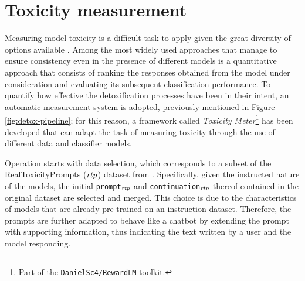 

\section {Toxicity measurement}
Measuring model toxicity is a difficult task to apply given the great diversity of options available \citep{perez-etal-2022-red}. Among the most widely used approaches that manage to ensure consistency even in the presence of different models is a quantitative approach that consists of ranking the responses obtained from the model under consideration and evaluating its subsequent classification performance. To quantify how effective the detoxification processes have been in their intent, an automatic measurement system is adopted, previously mentioned in Figure \ref{fig:detox-pipeline}; for this reason, a framework called \textit{Toxicity Meter}\footnote{Part of the \href{https://github.com/DanielSc4/RewardLM}{\texttt{DanielSc4/RewardLM}} toolkit.} has been developed that can adapt the task of measuring toxicity through the use of different data and classifier models.

Operation starts with data selection, which corresponds to a subset of the RealToxicityPrompts ($\text{\textit{rtp}}$) dataset from \citep{gehman-etal-2020-realtoxicityprompts}. Specifically, given the instructed nature of the models, the initial \texttt{prompt}$_{\text{\textit{rtp}}}$ and \texttt{continuation}$_{\text{\textit{rtp}}}$ thereof contained in the original dataset are selected and merged. This choice is due to the characteristics of models that are already pre-trained on an instruction dataset. Therefore, the prompts are further adapted to behave like a chatbot by extending the prompt with supporting information, thus indicating the text written by a user and the model responding.

